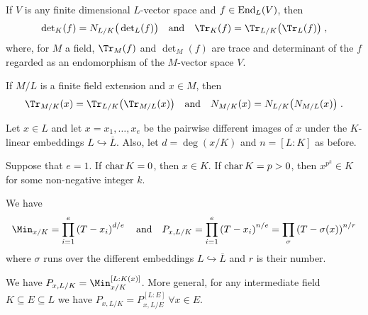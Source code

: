 \documentclass[a4paper,parskip=half,numbers=enddot, DIV=12, headheight=30pt]{scrreprt}
\begin{document}
\begin{thm}
	\begin{alphanumerate}
		\item {}
		If $V$ is any finite dimensional $L$-vector space and $f\in \operatorname{End}_L(V)$, then
		\begin{align*}
			\det_K(f) = N_{L/K}\big(\det_L(f)\big)\quad\text{and}\quad\Tr_K(f) = \Tr_{L/K}\big(\Tr_L(f)\big)\;,
		\end{align*}
		where, for $M$ a field, $\Tr_M(f)$ and $\det_M(f)$ are trace and determinant of the $f$ regarded as an endomorphism of the $M$-vector space $V$.
		\item 
		If $M/L$ is a finite field extension and $x\in M$, then
		\begin{align*}
			\Tr_{M/K}(x) = \Tr_{L/K}\big(\Tr_{M/L}(x)\big)\quad\text{and}\quad N_{M/K}(x) = N_{L/K}\big(N_{M/L}(x)\big)\;.
		\end{align*}
	\end{alphanumerate}
	Let $x\in L$ and let $x=x_1,\ldots, x_e$ be the pairwise different images of $x$ under the $K$-linear embeddings $L\hookrightarrow\overline{L}$. Also, let $d=\deg(x/K)$ and $n= [L:K]$ as before.
	\begin{alphanumerate}\setcounter{enumi}{2}
		\item Suppose that $e=1$. If $\operatorname{char} K=0$, then $x\in K$. If $\operatorname{char} K=p>0$, then $x^{p^k}\in K$ for some non-negative integer $k$.
		\item We have 
		\begin{align*}
			\Min_{x/K} = \prod_{i=1}^e \left(T-x_i\right)^{d/e}\quad\text{and}\quad P_{x,L/K} = \prod_{i=1}^e \left(T-x_i\right)^{n/e} = \prod_{\sigma}\left(T-\sigma(x)\right)^{n/r}
		\end{align*}
		where $\sigma$ runs over the different embeddings $L\hookrightarrow \overline{L}$ and $r$ is their number.
		\item We have $P_{x,L/K}=\Min_{x/K}^{[L:K(x)]}$. More general, for any intermediate field $K\subseteq E \subseteq L$ we have $P_{x,L/K} = P_{x,L/E}^{[L:E]}\ \forall x\in E$.
	\end{alphanumerate}
\end{thm}
\end{document}
